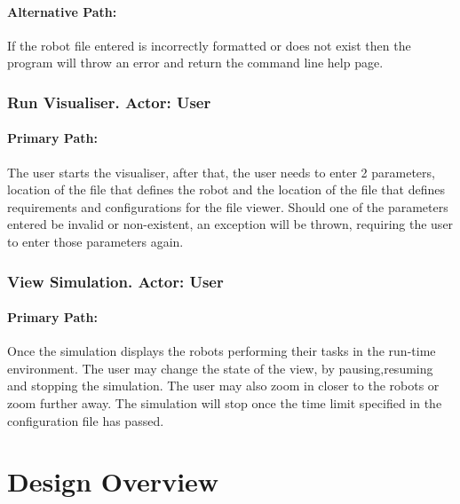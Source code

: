 \documentclass[11pt,a4paper]{article}
\begin{document}
\paragraph{Alternative Path:} If the robot file entered is incorrectly
formatted or does not exist then the program will throw an error and return the
command line help page.

\subsubsection{ Run Visualiser. Actor: User}
\paragraph{Primary Path:} The user starts the visualiser, after that, the user
needs to enter 2 parameters, location of the file that defines the robot and
the location of the file that defines requirements and configurations for the
file viewer. Should one of the parameters entered be invalid or non-existent,
an exception will be thrown, requiring the user to enter those parameters
again.

\subsubsection{ View Simulation. Actor: User}
\paragraph{Primary Path:} Once the simulation displays the robots performing
their tasks in the run-time environment. The user may change the state of the
view, by pausing,resuming and stopping the simulation. The user may also zoom
in closer to the robots or zoom further away. The simulation will stop once the
time limit specified in the configuration file has passed.

\section{Design Overview}
\label{s:design-overview}
%
%
%
\end{document}
